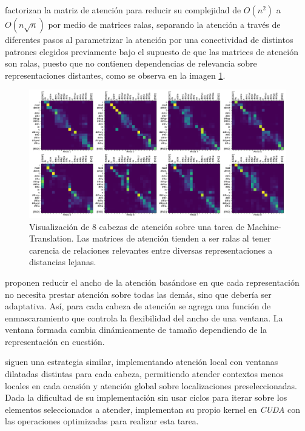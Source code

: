 \citeauthor{DBLP:journals/corr/abs-1904-10509} factorizan la matriz de atención para reducir su
complejidad de $O(n^2)$ a $O(n\sqrt{n})$ por medio de matrices ralas, separando la atención a través
de diferentes pasos al parametrizar la atención por una conectividad de distintos patrones elegidos
previamente bajo el supuesto de que las matrices de atención son ralas, puesto que no contienen
dependencias de relevancia sobre representaciones distantes, como se observa en la imagen \ref{fig:att-spar}.


\begin{figure}[ht!]
    \centering
    \includegraphics[width=0.7 \textwidth]{Chapters/2. Transformer/Figures/transformer/head_sparsity.png}
    \caption{Visualización de 8 cabezas de atención sobre una tarea de Machine-Translation. Las
    matrices de atención tienden a ser ralas al tener carencia de relaciones relevantes entre diversas
    representaciones a distancias lejanas.}
    \label{fig:att-spar}
\end{figure}

\citeauthor{DBLP:journals/corr/abs-1905-07799} proponen reducir el ancho de la atención basándose en
que cada representación no necesita prestar atención sobre todas las demás, sino que debería ser
adaptativa. Así, para cada cabeza de atención se agrega una función de enmascaramiento que controla
la flexibilidad del ancho de una ventana. La ventana formada cambia dinámicamente de tamaño
dependiendo de la representación en cuestión.

\citeauthor{DBLP:journals/corr/abs-2004-05150} siguen una estrategia similar, implementando
atención local con ventanas dilatadas distintas para cada cabeza, permitiendo atender contextos menos
locales en cada ocasión y atención global sobre localizaciones preseleccionadas. Dada la dificultad de
su implementación sin usar ciclos para iterar sobre los elementos seleccionados a atender, implementan
su propio kernel en \textit{CUDA} con las operaciones optimizadas para realizar esta tarea.

